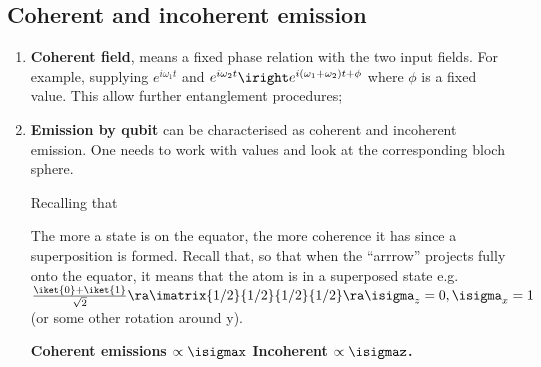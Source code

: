 \subsection{Coherent and incoherent emission}
 \begin{enumerate}
 	\item \textbf{Coherent field}, means a fixed phase relation with the two input fields. For example, supplying $ e^{i\omega_1t} $ and $ e^{i\omega_2t} \iright e^{i(\omega_1+\omega_2)t + \phi}$ where $ \phi $ is a fixed value. This allow further entanglement procedures;
 		\item \textbf{Emission by qubit} can be characterised as coherent and incoherent emission. One needs to work with  values and look at the corresponding bloch sphere. 
 	
 	\begin{figure}[h]
 	\end{figure}
 	
 	Recalling that
 	
 	
 	\noindent The more a state is on the equator, the more coherence it has since a superposition is formed. Recall that, so that when the ``arrrow'' projects fully onto the equator, it means that the atom is in a superposed state e.g. $ \frac{\iket{0}+\iket{1}}{\sqrt{2}} \ra \imatrix{1/2}{1/2}{1/2}{1/2} \ra \isigma_z = 0, \isigma_x = 1$ (or some other rotation around y).
 	
 	\begin{center}
 		\textbf{Coherent emissions $ \propto \isigmax$\newline
 			Incoherent $ \propto\isigmaz $. \large}
 	\end{center}
 	

\end{enumerate}
